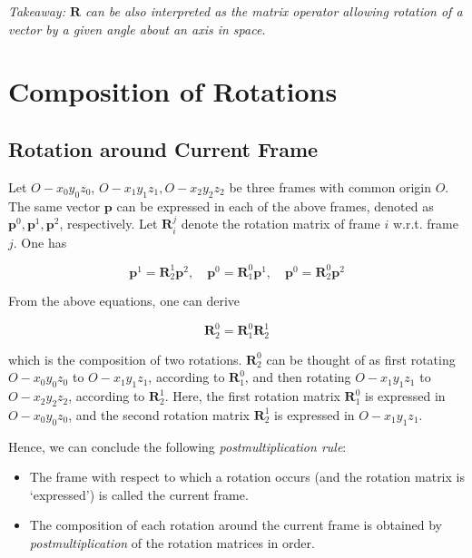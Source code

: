 \documentclass[10pt]{article}
\begin{document}
\emph{Takeaway: $\boldsymbol{R}$ can be also interpreted as the matrix operator allowing rotation of a vector by a given angle about an axis in space.}






\section{Composition of Rotations}

\subsection{Rotation around Current Frame}

Let $O-{x_{0} y_{0} z_{0}}$, $O- x_{1} y_{1} z_{1}, O- x_{2} y_{2} z_{2}$ be three frames with common origin $O$. The same vector $\boldsymbol{p}$ can be expressed in each of the above frames, denoted as $\boldsymbol{p}^{0}, \boldsymbol{p}^{1}, \boldsymbol{p}^{2}$, respectively. Let $\boldsymbol{R}_{i}^{j}$ denote the rotation matrix of frame $i$ w.r.t. frame $j$.
One has

$$
\boldsymbol{p}^{1}=\boldsymbol{R}_{2}^{1} \boldsymbol{p}^{2}, \quad \boldsymbol{p}^{0}=\boldsymbol{R}_{1}^{0} \boldsymbol{p}^{1}, \quad \boldsymbol{p}^{0}=\boldsymbol{R}_{2}^{0} \boldsymbol{p}^{2}
$$

From the above  equations, one can derive

$$
\boldsymbol{R}_{2}^{0}=\boldsymbol{R}_{1}^{0} \boldsymbol{R}_{2}^{1}
$$

which is the composition of two rotations.  $\boldsymbol{R}_{2}^{0}$ can be thought of as  first rotating $O- x_{0} y_{0} z_{0}$ to $O- x_{1} y_{1} z_{1}$, according to $\boldsymbol{R}_{1}^{0}$, and then rotating $O- x_{1} y_{1} z_{1}$ to $O - x_{2} y_{2} z_{2}$, according to $\boldsymbol{R}_{2}^{1}$. Here, the first rotation matrix $\boldsymbol{R}_{1}^{0}$ is expressed in $O- x_{0} y_{0} z_{0}$, and the second rotation matrix $\boldsymbol{R}_{2}^{1}$ is expressed in $O- x_{1} y_{1} z_{1}$. 

Hence, we can conclude the following \emph{postmultiplication rule}:

\begin{itemize}
    \item The  frame with respect to which a rotation occurs (and the rotation matrix is `expressed') is called the current frame.
    \item The composition of each  rotation around  the current frame is  obtained by \emph{postmultiplication} of the rotation matrices in  order.
\end{itemize}
\end{document}
